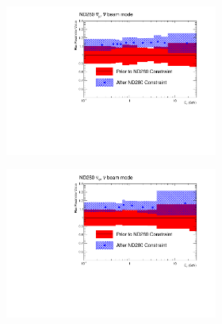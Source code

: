 \begin{figure}[h]
	\begin{subfigure}[t]{\textwidth}
		\begin{subfigure}[t]{0.24\textwidth}
			\includegraphics[width=\textwidth, trim={0mm 0mm 20mm 0mm}, clip]{figures/official/nd_nf_numub_flux_parms_bias_01}
		\end{subfigure}
		\begin{subfigure}[t]{0.24\textwidth}
			\includegraphics[width=\textwidth, trim={0mm 0mm 20mm 0mm}, clip]{figures/official/nd_nf_nueb_flux_parms_bias_01}
		\end{subfigure}
		\begin{subfigure}[t]{0.24\textwidth}

\end{subfigure}
\end{subfigure}
\end{figure}

